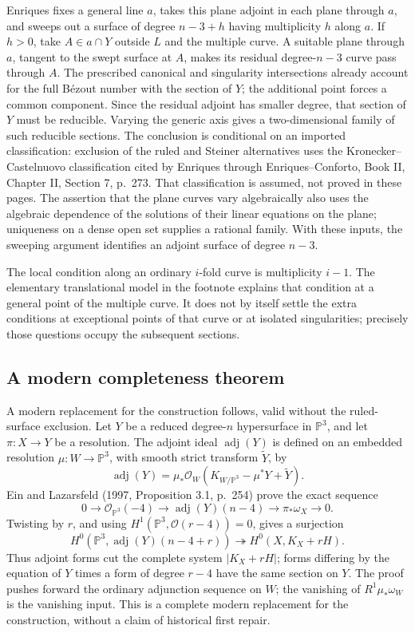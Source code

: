 Enriques fixes a general line \(a\), takes this plane adjoint in each plane through \(a\), and sweeps out a surface of degree \(n-3+h\) having multiplicity \(h\) along \(a\). If \(h>0\), take \(A\in a\cap Y\) outside \(L\) and the multiple curve. A suitable plane through \(a\), tangent to the swept surface at \(A\), makes its residual degree-\(n-3\) curve pass through \(A\). The prescribed canonical and singularity intersections already account for the full Bézout number with the section of \(Y\); the additional point forces a common component. Since the residual adjoint has smaller degree, that section of \(Y\) must be reducible. Varying the generic axis gives a two-dimensional family of such reducible sections. The conclusion is conditional on an imported classification: exclusion of the ruled and Steiner alternatives uses the Kronecker--Castelnuovo classification cited by Enriques through Enriques--Conforto, Book II, Chapter II, Section 7, p.~273. That classification is assumed, not proved in these pages. The assertion that the plane curves vary algebraically also uses the algebraic dependence of the solutions of their linear equations on the plane; uniqueness on a dense open set supplies a rational family. With these inputs, the sweeping argument identifies an adjoint surface of degree \(n-3\).

The local condition along an ordinary \(i\)-fold curve is multiplicity \(i-1\). The elementary translational model in the footnote explains that condition at a general point of the multiple curve. It does not by itself settle the extra conditions at exceptional points of that curve or at isolated singularities; precisely those questions occupy the subsequent sections.

\subsection{A modern completeness theorem}

A modern replacement for the construction follows, valid without the ruled-surface exclusion. Let \(Y\) be a reduced degree-\(n\) hypersurface in \(\mathbb{P}^3\), and let \(\pi:X\to Y\) be a resolution. The adjoint ideal \(\operatorname{adj}(Y)\) is defined on an embedded resolution \(\mu:W\to\mathbb{P}^3\), with smooth strict transform \(\widetilde Y\), by \[
\operatorname{adj}(Y)
=\mu_*\mathcal O_W(K_{W/\mathbb{P}^3}-\mu^*Y+\widetilde Y).
\] Ein and Lazarsfeld (1997, Proposition 3.1, p.~254) prove the exact sequence \[
0\longrightarrow\mathcal O_{\mathbb{P}^3}(-4)
\longrightarrow\operatorname{adj}(Y)(n-4)
\longrightarrow\pi_*\omega_X\longrightarrow0.
\] Twisting by \(r\), and using \(H^1(\mathbb{P}^3,\mathcal O(r-4))=0\), gives a surjection \[
H^0(\mathbb{P}^3,\operatorname{adj}(Y)(n-4+r))
\twoheadrightarrow H^0(X,K_X+rH).
\tag{III.1}
\] Thus adjoint forms cut the complete system \(|K_X+rH|\); forms differing by the equation of \(Y\) times a form of degree \(r-4\) have the same section on \(Y\). The proof pushes forward the ordinary adjunction sequence on \(W\); the vanishing of \(R^1\mu_*\omega_W\) is the vanishing input. This is a complete modern replacement for the construction, without a claim of historical first repair.

